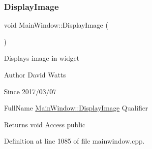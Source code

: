 \subsubsection{\texorpdfstring{Display\+Image}{DisplayImage}}
{\footnotesize\ttfamily void Main\+Window\+::\+Display\+Image (\begin{DoxyParamCaption}{ }\end{DoxyParamCaption})\hspace{0.3cm}{\ttfamily [slot]}}

Displays image in widget

\begin{DoxyAuthor}{Author}
David Watts 
\end{DoxyAuthor}
\begin{DoxySince}{Since}
2017/03/07
\end{DoxySince}
Full\+Name \hyperlink{class_main_window_a8e20e1254b179ca9ec054ec908d9cc43}{Main\+Window\+::\+Display\+Image} Qualifier \begin{DoxyReturn}{Returns}
void Access public 
\end{DoxyReturn}


Definition at line 1085 of file mainwindow.\+cpp.

